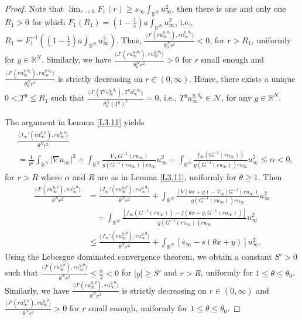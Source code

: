 \documentclass[reqno]{amsart}
\begin{document}
\begin{proof}
Note that $\lim_{r\to0}F_1(r)\geq s_\infty\int_{\mathbb{R}^{N}}u_{\infty}^{2}$, 
then there is one and only one  $R_1>0$  for which 
$F_1(R_1)=(1-\frac{1}{c})a\int_{\mathbb{R}^N}u_\infty^2$, i.e., 
$R_1=F_1^{-1}((1-\frac{1}{c})a\int_{\mathbb{R}^N}u_\infty^2)$. 
Thus, $\frac{\langle J'(ru_{\infty}^{y,\theta_0}),ru_{\infty}^{y,\theta_0}\rangle}{\theta^N_0r^{2}}<0$, 
for $r>R_1$, uniformly for $y\in{\mathbb{R}^N}$. Similarly, we have $\frac{\langle J'(ru_{\infty}^{y,\theta_0}),ru_{\infty}^{y,\theta_0}\rangle}{\theta^N_0r^{2}}>0$ for $r$ small enough and
$\frac{\langle J'(ru_{\infty}^{y,\theta_0}),ru_{\infty}^{y,\theta_0}\rangle}{\theta^N_0r^{2}}$ 
is strictly decreasing on $r\in(0,\infty)$. Hence, there exists a unique $0<T^y\leq R_1$ 
such that $\frac{\langle J'(T^yu_{\infty}^{y,\theta_0}),T^yu_{\infty}^{y,\theta_0}\rangle}{\theta^N_0(T^y)^{2}}=0$, i.e., 
$T^y u_{\infty}^{y,\theta_0}\in\mathcal{N}$, for any $y\in{\mathbb{R}^N}$.

The argument in Lemma \ref{L3.11} yields 
\begin{align*}
&\frac{\langle J_\infty'(ru_{\infty}^{y,\theta}),ru_{\infty}^{y,\theta}\rangle}{\theta^Nr^{2}} \\
&=\frac{1}{\theta^2}\int_{\mathbb{R}^{N}} \vert \nabla u_{\infty} \vert^{2} + \int_{\mathbb{R}^{N}} \frac{V_\infty G^{-1}(ru_{\infty})}{g(G^{-1}(ru_{\infty}))ru_{\infty}} u_{\infty}^{2} 
  - \int_{\mathbb{R}^{N}}  \frac{f_\infty (G^{-1}(ru_{\infty}))}{g(G^{-1}(ru_{\infty}))ru_{\infty}} u_{\infty}^{2}\leq\alpha<0,
\end{align*} 
for $r>R$ where $\alpha$ and $R$ are as in Lemma \ref{L3.11}, uniformly for $\theta\geq1$. 
Then 
\begin{align*}
\frac{\langle J'(ru_{\infty}^{y,\theta}),ru_{\infty}^{y,\theta}\rangle}{\theta^Nr^{2}} 
&=\frac{\langle J_\infty'(ru_{\infty}^{y,\theta}),ru_{\infty}^{y,\theta}\rangle}{\theta^Nr^{2}}
 + \int_{\mathbb{R}^{N}} \frac{[V(\theta x+y)-V_\infty] G^{-1}(ru_{\infty})}{g(G^{-1}(ru_{\infty}))ru_{\infty}} u_{\infty}^{2} \\
&\quad + \int_{\mathbb{R}^{N}}  \frac{[f_\infty( G^{-1}(ru_{\infty}))-f(\theta x+y,G^{-1}(ru_{\infty}))]}{g(G^{-1}(ru_{\infty}))ru_{\infty}} u_{\infty}^{2}\\
&\leq\frac{\langle J_\infty'(ru_{\infty}^{y,\theta}),ru_{\infty}^{y,\theta}\rangle}{\theta^Nr^{2}}+\int_{\mathbb{R}^{N}}[s_\infty-s(\theta x+y)]u_{\infty}^{2}.
\end{align*} 
Using the Lebesgue dominated convergence theorem, we obtain a constant  $S'>0$ such that 
$\frac{\langle J'(ru_{\infty}^{y,\theta}),ru_{\infty}^{y,\theta}\rangle}{\theta^Nr^{2}} \leq\frac{\alpha}{2}<0$ 
for  $|y|\geq S'$ and $r>R$,  uniformly for $1\leq\theta\leq\theta_0$. 
Similarly, we have $\frac{\langle J'(ru_{\infty}^{y,\theta}),ru_{\infty}^{y,\theta}\rangle}{\theta^Nr^{2}}$ 
is strictly decreasing on $r\in(0,\infty)$ and 
$\frac{\langle J'(ru_{\infty}^{y,\theta}),ru_{\infty}^{y,\theta}\rangle}{\theta^Nr^{2}}>0$ for $r$ 
small enough, uniformly for $1\leq\theta\leq\theta_0$. 


\end{proof}
\end{document}
